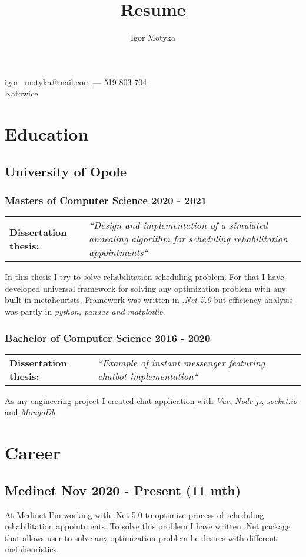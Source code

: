 \documentclass[10pt]{article}
\author{Igor Motyka}
\title{Resume}
\makeatletter
\renewcommand{\maketitle}{
 \begin{center}
    \huge\bfseries\theauthor
 \end{center}
 \begin{center}
    \href{mailto:igor_motyka@mail.com}{igor\_motyka@mail.com} --- 519 803 704 \vspace{1em}\\
    Katowice
 \end{center}
 }
\makeatother
\begin{document}
\maketitle

\section{Education}
\subsection{University of Opole}
\subsubsection{Masters of Computer Science 2020 - 2021}
\begin{table}[H]
    \begin{tabularx}{\textwidth}{@{}l X}
     \textbf{Dissertation thesis:} & \textit{``Design and implementation of a simulated annealing algorithm for scheduling rehabilitation appointments``} \\
    \end{tabularx}
\end{table}
\noindent In this thesis I try to solve rehabilitation scheduling problem. For that I have developed universal framework for solving any optimization problem with any built in metaheurists. Framework was written in \emph{.Net 5.0} but efficiency analysis was partly in \emph{python, pandas and matplotlib}.
\subsubsection{Bachelor of Computer Science 2016 - 2020}
\begin{table}[H]
    \begin{tabularx}{\textwidth}{@{}l X}
    \textbf{Dissertation thesis:} &  \textit{``Example of instant messenger featuring chatbot implementation``}\\
    \end{tabularx}
\end{table}
\noindent As my engineering project I created \href{https://www.behance.net/gallery/91600605/Gymba-chat}{chat application} with \emph{Vue}, \emph{Node js}, \emph{socket.io} and \emph{MongoDb}.
\section{Career}
\subsection{Medinet Nov 2020 - Present (11 mth)}
At Medinet I'm working with .Net 5.0 to optimize process of scheduling rehabilitation appointments. To solve this problem I have written .Net package that allows user to solve any optimization problem he desires with different metaheuristics.
\end{document}
